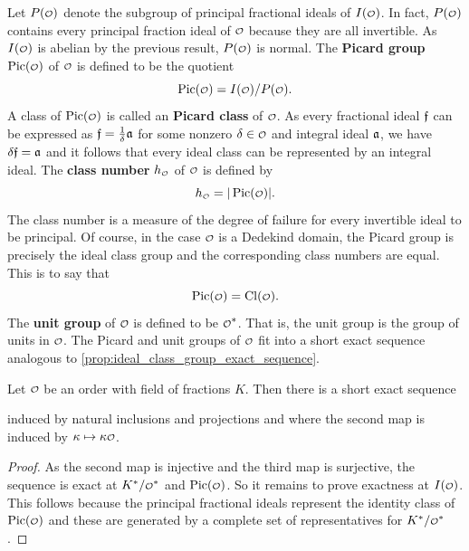     Let \(P(\smc{O})\) denote the subgroup of principal fractional ideals of \(I(\smc{O})\). In fact, \(P(\smc{O})\) contains every principal fraction ideal of \(\smc{O}\) because they are all invertible. As \(I(\smc{O})\) is abelian by the previous result, \(P(\smc{O})\) is normal. The \textbf{Picard group} \(\Pic(\smc{O})\) of \(\smc{O}\) is defined to be the quotient
    \[
      \Pic(\smc{O}) = I(\smc{O})/P(\smc{O}).
    \]
    A class of \(\Pic(\smc{O})\) is called an \textbf{Picard class} of \(\smc{O}\). As every fractional ideal \(\mathfrak{f}\) can be expressed as \(\mathfrak{f} = \frac{1}{\delta}\mathfrak{a}\) for some nonzero \(\d \in \smc{O}\) and integral ideal \(\mathfrak{a}\), we have \(\delta\mathfrak{f} = \mathfrak{a}\) and it follows that every ideal class can be represented by an integral ideal. The \textbf{class number} \(h_{\smc{O}}\) of \(\smc{O}\) is defined by
    \[
      h_{\smc{O}} = |\Pic(\smc{O})|.
    \]
    The class number is a measure of the degree of failure for every invertible ideal to be principal. Of course, in the case \(\smc{O}\) is a Dedekind domain, the Picard group is precisely the ideal class group and the corresponding class numbers are equal. This is to say that
    \[
      \Pic(\smc{O}) = \Cl(\smc{O}).
    \]
    The \textbf{unit group} of \(\smc{O}\) is defined to be \(\smc{O}^{\ast}\). That is, the unit group is the group of units in \(\smc{O}\). The Picard and unit groups of \(\smc{O}\) fit into a short exact sequence analogous to \cref{prop:ideal_class_group_exact_sequence}.

    \begin{proposition}\label{prop:Picard_class_group_exact_sequence}
      Let \(\smc{O}\) be an order with field of fractions \(K\). Then there is a short exact sequence
      \begin{center}
      \end{center}
      induced by natural inclusions and projections and where the second map is induced by \(\k \mapsto \k\smc{O}\).
    \end{proposition}
    \begin{proof}
      As the second map is injective and the third map is surjective, the sequence is exact at \(K^{\ast}/\smc{O}^{\ast}\) and \(\Pic(\smc{O})\). So it remains to prove exactness at \(I(\smc{O})\). This follows because the principal fractional ideals represent the identity class of \(\Pic(\smc{O})\) and these are generated by a complete set of representatives for \(K^{\ast}/\smc{O}^{\ast}\).
    \end{proof}

